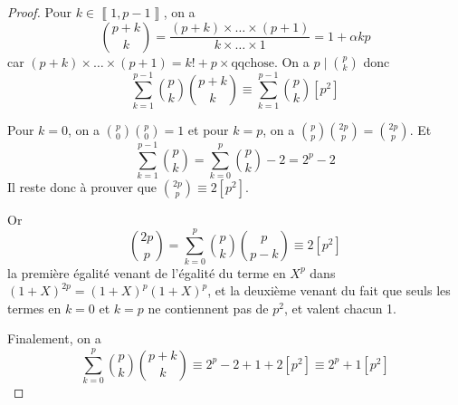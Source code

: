 \begin{proof}
	Pour $k\in\left\llbracket 1,p-1\right\rrbracket$, on a 
	\begin{equation}
		\binom{p+k}{k}=\frac{(p+k)\times\dots\times(p+1)}{k\times\dots\times 1}=1+\alpha kp
	\end{equation}
	car $(p+k)\times\dots\times(p+1)=k!+p\times\text{qqchose}$. On a $p\mid\binom{p}{k}$ donc 
	\begin{equation}
		\sum_{k=1}^{p-1}\binom{p}{k}\binom{p+k}{k}\equiv\sum_{k=1}^{p-1}\binom{p}{k}[p^{2}]
	\end{equation}

	Pour $k=0$, on a $\binom{p}{0}\binom{p}{0}=1$ et pour $k=p$, on a $\binom{p}{p}\binom{2p}{p}=\binom{2p}{p}$. Et 
	\begin{equation}
		\sum_{k=1}^{p-1}\binom{p}{k}=\sum_{k=0}^{p}\binom{p}{k}-2=2^{p}-2
	\end{equation}
	Il reste donc à prouver que $\binom{2p}{p}\equiv 2[p^{2}]$.

	Or 
	\begin{equation}
		\binom{2p}{p}=\sum_{k=0}^{p}\binom{p}{k}\binom{p}{p-k}\equiv2[p^{2}]
	\end{equation}
	la première égalité venant de l'égalité du terme en $X^{p}$ dans $(1+X)^{2p}=(1+X)^{p}(1+X)^{p}$, et la deuxième venant du fait que seuls les termes en $k=0$ et $k=p$ ne contiennent pas de $p^{2}$, et valent chacun 1.

	Finalement, on a 
	\begin{equation}
		\boxed{
		\sum_{k=0}^{p}\binom{p}{k}\binom{p+k}{k}\equiv 2^{p}-2+1+2[p^{2}]\equiv 2^{p}+1[p^{2}]}
	\end{equation}
\end{proof}

